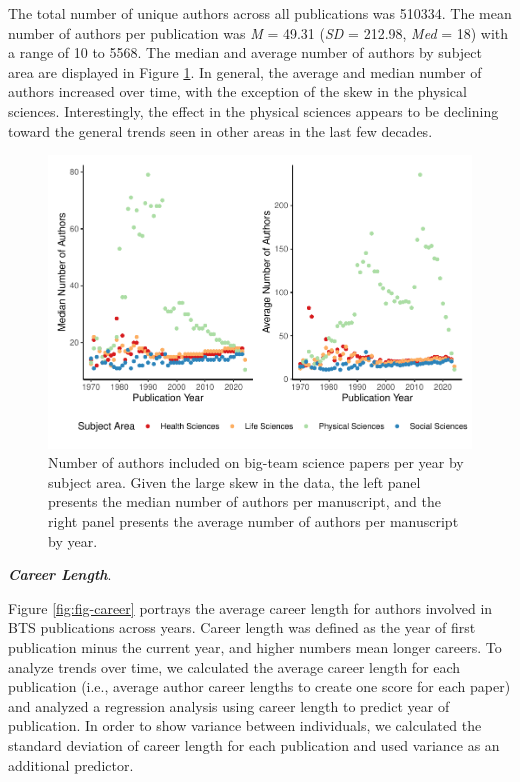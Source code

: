 \documentclass[
  man,floatsintext]{apa6}
\begin{document}
The total number of unique authors across all publications was 510334. The mean number of authors per publication was \emph{M} = 49.31 (\emph{SD} = 212.98, \emph{Med} = 18) with a range of 10 to 5568. The median and average number of authors by subject area are displayed in Figure \ref{fig:fig-author-year}. In general, the average and median number of authors increased over time, with the exception of the skew in the physical sciences. Interestingly, the effect in the physical sciences appears to be declining toward the general trends seen in other areas in the last few decades.

\begin{figure}
\centering
\includegraphics{manuscript_scopus_files/figure-latex/fig-author-year-1.pdf}
\caption{\label{fig:fig-author-year}Number of authors included on big-team science papers per year by subject area. Given the large skew in the data, the left panel presents the median number of authors per manuscript, and the right panel presents the average number of authors per manuscript by year.}
\end{figure}

\textbf{\emph{Career Length}}.

Figure \ref{fig:fig-career} portrays the average career length for authors involved in BTS publications across years. Career length was defined as the year of first publication minus the current year, and higher numbers mean longer careers. To analyze trends over time, we calculated the average career length for each publication (i.e., average author career lengths to create one score for each paper) and analyzed a regression analysis using career length to predict year of publication. In order to show variance between individuals, we calculated the standard deviation of career length for each publication and used variance as an additional predictor.
\end{document}
